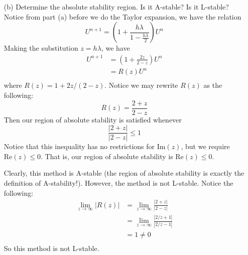 \documentclass{article}
\begin{document}
\begin{enumerate}
    
    \item[(b)] Determine the absolute stability region. Is it A-stable? Is it L-stable?
    \newline\newline
    Notice from part (a) before we do the Taylor expansion, we have the relation
    \[U^{n+1} = \left(1 + \frac{h\lambda}{1 - \frac{h\lambda}{2}}\right)U^n\]
    Making the substitution $z = h\lambda$, we have
    \begin{align*}
        U^{n+1} &= \left(1 + \frac{2z}{2-z}\right)U^n \\
        &= R(z)U^n \\
    \end{align*}
    where $R(z) = 1 + 2z/(2-z)$. Notice we may rewrite $R(z)$ as the following:
    \[R(z) = \frac{2 + z}{2 - z}\]
    Then our region of absolute stability is satisfied whenever
    \[\frac{|2 + z|}{|2 - z|} \leq 1\]
    Notice that this inequality has no restrictions for $\text{Im}(z)$, but we require $\text{Re}(z) \leq 0$. That is, our region of absolute stability is $\text{Re}(z) \leq 0$.
    \newline
    
    Clearly, this method is A-stable (the region of absolute stability is exactly the definition of A-stability!). However, the method is not L-stable. Notice the following:
    \begin{align*}
        \lim_{z \to \infty} |R(z)| &= \lim_{z \to \infty} \frac{|2 + z|}{|2 - z|} \\
        &= \lim_{z \to \infty} \frac{|2/z + 1|}{|2/z - 1|} \\
        &= 1 \neq 0 \\
    \end{align*}
    So this method is not L-stable.
    

\end{enumerate}
\end{document}

